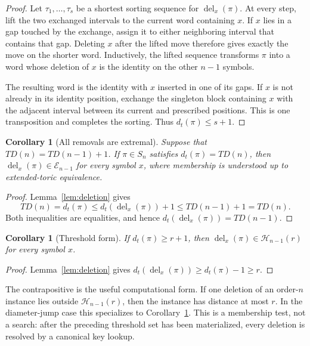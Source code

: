 \documentclass[11pt]{article}
\newtheorem{corollary}[theorem]{Corollary}
\theoremstyle{definition}
\theoremstyle{remark}
\newcommand{\En}{\mathcal E}
\newcommand{\Hn}{\mathcal H}
\newcommand{\dist}{d_t}
\newcommand{\Del}{\operatorname{del}}
\begin{document}
\begin{proof}
Let $\tau_1,\ldots,\tau_s$ be a shortest sorting sequence for
$\Del_x(\pi)$.
At every step, lift the two exchanged intervals to the current word containing
$x$.  If $x$ lies in a gap touched by the exchange, assign it to either
neighboring interval that contains that gap.  Deleting $x$ after the lifted
move therefore gives exactly the move on the shorter word.  Inductively, the
lifted sequence transforms $\pi$ into a word whose deletion of $x$ is the
identity on the other $n-1$ symbols.

The resulting word is the identity with $x$ inserted in one of its gaps.  If
$x$ is not already in its identity position, exchange the singleton block
containing $x$ with the adjacent interval between its current and prescribed
positions.  This is one transposition and completes the sorting.  Thus
$\dist(\pi)\leq s+1$.
\end{proof}

\begin{corollary}[All removals are extremal]\label{cor:all-removals}
Suppose that $TD(n)=TD(n-1)+1$.  If
$\pi\in S_n$ satisfies $\dist(\pi)=TD(n)$, then
$\Del_x(\pi)\in\En_{n-1}$ for every symbol $x$, where membership is understood
up to extended-toric equivalence.
\end{corollary}

\begin{proof}
Lemma~\ref{lem:deletion} gives
\[
 TD(n)=\dist(\pi)\leq\dist(\Del_x(\pi))+1
 \leq TD(n-1)+1=TD(n).
\]
Both inequalities are equalities, and hence
$\dist(\Del_x(\pi))=TD(n-1)$.
\end{proof}

\begin{corollary}[Threshold form]\label{cor:threshold-removals}
If $\dist(\pi)\geq r+1$, then
$\Del_x(\pi)\in\Hn_{n-1}(r)$ for every symbol $x$.
\end{corollary}

\begin{proof}
Lemma~\ref{lem:deletion} gives
$\dist(\Del_x(\pi))\geq\dist(\pi)-1\geq r$.
\end{proof}

The contrapositive is the useful computational form.  If one deletion of an
order-$n$ instance lies outside $\Hn_{n-1}(r)$, then the instance has distance
at most $r$.  In the diameter-jump case this specializes to
Corollary~\ref{cor:all-removals}.  This is a membership test, not a search:
after the preceding threshold set has been materialized, every deletion is
resolved by a canonical key lookup.
\end{document}
